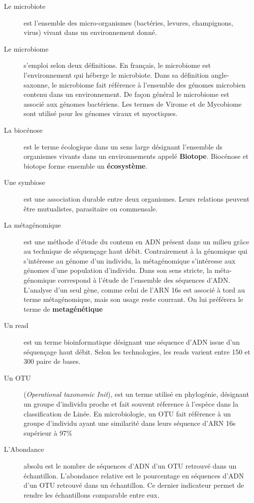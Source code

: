 \documentclass[12pt,a4paper]{article}
\begin{document}
\begin{description}
  \item[Le microbiote] est l’ensemble des micro-organismes (bactéries, levures, champignons, virus) vivant dans un environnement donné.
  
\item[Le microbiome] s’emploi selon deux définitions. En français, le microbiome est l'environnement qui héberge le microbiote. Dans sa définition angle-saxonne, le microbiome fait référence à l’ensemble des génomes microbien contenu dans un environnement. 
De façon général le microbiome est associé aux génomes bactériens. Les termes de Virome et de Mycobiome sont utilisé pour les génomes viraux et myoctiques. 

\item[La biocénose] est le terme écologique dans un sens large désignant l'ensemble ds organismes vivants dans un environnements appelé \textbf{Biotope}. Biocénose et biotope forme ensemble un \textbf{écosystème}.

\item[Une symbiose] est une association durable entre deux organismes. Leurs relations peuvent être mutualistes, parasitaire ou commensale.

\item[La métagénomique] est une méthode d’étude du contenu en ADN présent dans un milieu grâce au technique de séquençage haut débit. Contrairement à la génomique qui s’intéresse au génome d’un individu, la métagénomique s’intéresse aux génomes d’une population d’individu.
Dans son sens stricte, la méta-génomique correspond à l’étude de l’ensemble des séquences d’ADN. L’analyse d’un seul gène, comme celui de l’ARN 16s est associé à tord au terme métagénomique, mais son usage reste courrant. On lui préférera le terme de \textbf{metagénétique}

\item[Un read] est un terme bioinformatique désignant une séquence d’ADN issue d’un séquençage haut débit. Selon les technologies, les reads varient entre 150 et 300 paire de bases.

\item[Un OTU] (\textit{Operational taxonomic Init}), est un terme utilisé en phylogénie, désignant un groupe d’individu proche et fait souvent réference à l’espèce dans la classification de Linée.
En microbiologie, un OTU fait référence à un groupe d’individu ayant une similarité dans leurs séquence d'ARN 16s supérieur à 97\%

\item[L'Abondance] absolu est le nombre de séquences d’ADN d’un OTU retrouvé dans un échantillon. 
L’abondance relative est le pourcentage en séquences d'ADN d'un OTU retrouvé dans un échantillon. Ce dernier indicateur permet de rendre les échantillons comparable entre eux.



\end{description}
\end{document}
